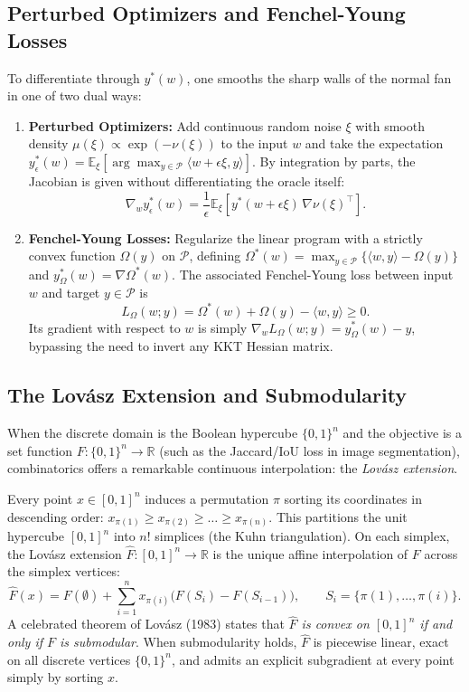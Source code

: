 \subsection{Perturbed Optimizers and Fenchel-Young Losses}

To differentiate through $y^*(w)$, one smooths the sharp walls of the normal fan in one of two dual ways:
\begin{enumerate}
    \item \textbf{Perturbed Optimizers:} Add continuous random noise $\xi$ with smooth density $\mu(\xi) \propto \exp(-\nu(\xi))$ to the input $w$ and take the expectation $y_\epsilon^*(w) = \mathbb{E}_\xi[\arg\max_{y \in \mathcal{P}} \langle w + \epsilon \xi, y \rangle]$. By integration by parts, the Jacobian is given without differentiating the oracle itself:
    \[
        \nabla_w y_\epsilon^*(w) = \frac{1}{\epsilon} \mathbb{E}_\xi\!\left[ y^*(w + \epsilon \xi) \, \nabla \nu(\xi)^\top \right].
    \]
    \item \textbf{Fenchel-Young Losses:} Regularize the linear program with a strictly convex function $\Omega(y)$ on $\mathcal{P}$, defining $\Omega^*(w) = \max_{y \in \mathcal{P}} \{\langle w, y \rangle - \Omega(y)\}$ and $y_\Omega^*(w) = \nabla \Omega^*(w)$. The associated Fenchel-Young loss between input $w$ and target $y \in \mathcal{P}$ is
    \begin{equation}
        L_\Omega(w; y) = \Omega^*(w) + \Omega(y) - \langle w, y \rangle \ge 0.
    \end{equation}
    Its gradient with respect to $w$ is simply $\nabla_w L_\Omega(w; y) = y_\Omega^*(w) - y$, bypassing the need to invert any KKT Hessian matrix.
\end{enumerate}

\subsection{The Lovász Extension and Submodularity}

When the discrete domain is the Boolean hypercube $\{0,1\}^n$ and the objective is a set function $F: \{0,1\}^n \to \mathbb{R}$ (such as the Jaccard/IoU loss in image segmentation), combinatorics offers a remarkable continuous interpolation: the \emph{Lovász extension}.

Every point $x \in [0, 1]^n$ induces a permutation $\pi$ sorting its coordinates in descending order: $x_{\pi(1)} \ge x_{\pi(2)} \ge \dots \ge x_{\pi(n)}$. This partitions the unit hypercube $[0,1]^n$ into $n!$ simplices (the Kuhn triangulation). On each simplex, the Lovász extension $\hat{F}: [0,1]^n \to \mathbb{R}$ is the unique affine interpolation of $F$ across the simplex vertices:
\begin{equation}
    \hat{F}(x) = F(\emptyset) + \sum_{i=1}^n x_{\pi(i)} \Big( F(S_i) - F(S_{i-1}) \Big), \qquad S_i = \{\pi(1), \dots, \pi(i)\}.
\end{equation}
A celebrated theorem of Lovász (1983) states that \emph{$\hat{F}$ is convex on $[0,1]^n$ if and only if $F$ is submodular}. When submodularity holds, $\hat{F}$ is piecewise linear, exact on all discrete vertices $\{0,1\}^n$, and admits an explicit subgradient at every point simply by sorting $x$.

